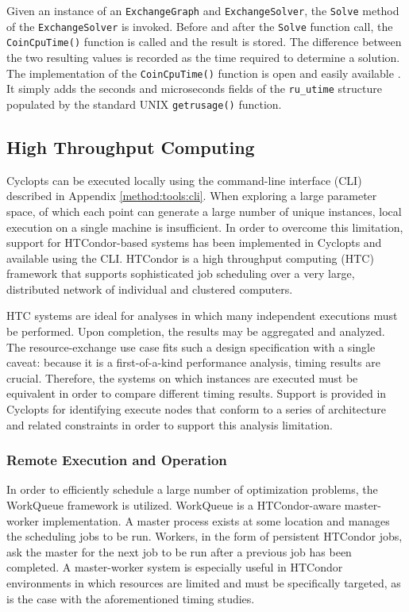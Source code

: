 Given an instance of an \texttt{ExchangeGraph} and \texttt{ExchangeSolver}, the
\texttt{Solve} method of the \texttt{ExchangeSolver} is invoked. Before and
after the \texttt{Solve} function call, the \texttt{CoinCpuTime()} function is
called and the result is stored. The difference between the two resulting values
is recorded as the time required to determine a solution. The implementation of
the \texttt{CoinCpuTime()} function is open and easily available
\cite{coinosi}. It simply adds the seconds and microseconds fields of the
\texttt{ru\_utime} structure populated by the standard UNIX
\texttt{getrusage()} function.

\subsection{High Throughput Computing}\label{method:tools:htc}

Cyclopts can be executed locally using the  command-line
interface (CLI) described in Appendix \ref{method:tools:cli}. When exploring a
large parameter space, of which each point can generate a large number of unique
instances, local execution on a single machine is insufficient. In order to
overcome this limitation, support for HTCondor-based systems has been implemented
in Cyclopts and available using the  CLI. HTCondor
\cite{condor-practice} is a high throughput computing (HTC) framework that
supports sophisticated job scheduling over a very large, distributed network of
individual and clustered computers.

HTC systems are ideal for analyses in which many independent executions must be
performed. Upon completion, the results may be aggregated and analyzed. The
resource-exchange use case fits such a design specification with a single
caveat: because it is a first-of-a-kind performance analysis, timing results are
crucial. Therefore, the systems on which instances are executed must be
equivalent in order to compare different timing results. Support is provided in
Cyclopts for identifying execute nodes that conform to a series of architecture
and related constraints in order to support this analysis limitation.

\subsubsection{Remote Execution and Operation}

In order to efficiently schedule a large number of optimization problems, the
WorkQueue framework \cite{bui_work_2011} is utilized. WorkQueue is a
HTCondor-aware master-worker implementation. A master process exists at some
location and manages the scheduling jobs to be run. Workers, in the form of
persistent HTCondor jobs, ask the master for the next job to be run after a
previous job has been completed. A master-worker system is especially useful in
HTCondor environments in which resources are limited and must be specifically
targeted, as is the case with the aforementioned timing studies.

